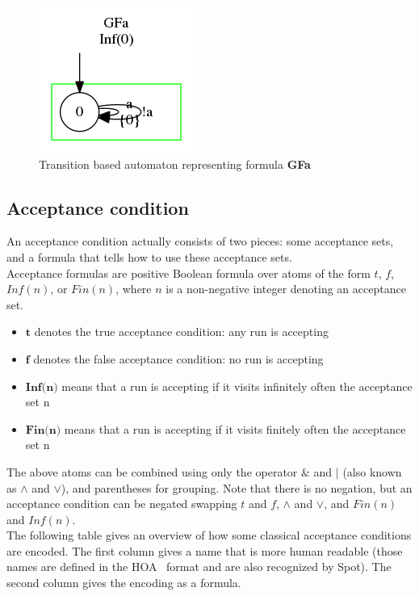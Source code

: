 \begin{figure}[H]
 \centering
 \includegraphics[scale=0.8]{img/trans_based.png}
 \caption{Transition based automaton representing formula \textbf{GFa}}
 \label{fig:transition_based}
\end{figure}

\subsection{Acceptance condition}
An acceptance condition actually consists of two pieces: some acceptance sets, and a formula that tells
how to use these acceptance sets.\\

Acceptance formulas are positive Boolean formula over atoms of the form $t$, $f$, $Inf(n)$, or $Fin(n)$,
where $n$ is a non-negative integer denoting an acceptance set.
\begin{itemize}
 \item $\textbf{t}$ denotes the true acceptance condition: any run is accepting
 \item $\textbf{f}$ denotes the false acceptance condition: no run is accepting
 \item $\textbf{Inf(n)}$ means that a run is accepting if it visits infinitely often the acceptance set n
 \item $\textbf{Fin(n)}$ means that a run is accepting if it visits finitely often the acceptance set n
\end{itemize}

The above atoms can be combined using only the operator $\&$ and $|$ (also known as $\land$ and $\lor$), and
parentheses for grouping. Note that there is no negation, but an acceptance condition can be negated
swapping $t$ and $f$, $\land$ and $\lor$, and $Fin(n)$ and $Inf(n)$.\\

The following table gives an overview of how some classical acceptance conditions are encoded. The first
column gives a name that is more human readable (those names are defined in the HOA~\cite{3} format and
are also recognized by Spot). The second column gives the encoding as a formula.

